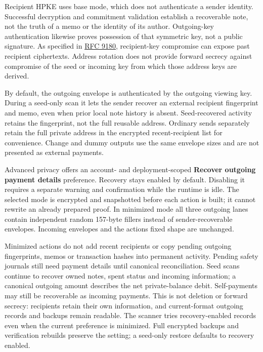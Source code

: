 \documentclass[11pt,letterpaper]{article}
\begin{document}
Recipient HPKE uses base mode, which does not authenticate a sender
identity. Successful decryption and commitment validation establish a
recoverable note, not the truth of a memo or the identity of its author.
Outgoing-key authentication likewise proves possession of that symmetric
key, not a public signature. As specified in
\href{https://www.rfc-editor.org/rfc/rfc9180\#section-9.1}{RFC 9180},
recipient-key compromise can expose past recipient ciphertexts. Address
rotation does not provide forward secrecy against compromise of the seed
or incoming key from which those address keys are derived.

By default, the outgoing envelope is authenticated by the outgoing
viewing key. During a seed-only scan it lets the sender recover an
external recipient fingerprint and memo, even when prior local note
history is absent. Seed-recovered activity retains the fingerprint, not
the full reusable address. Ordinary sends separately retain the full
private address in the encrypted recent-recipient list for convenience.
Change and dummy outputs use the same envelope sizes and are not
presented as external payments.

Advanced privacy offers an account- and deployment-scoped
\textbf{Recover outgoing payment details} preference. Recovery stays
enabled by default. Disabling it requires a separate warning and
confirmation while the runtime is idle. The selected mode is encrypted
and snapshotted before each action is built; it cannot rewrite an
already prepared proof. In minimized mode all three outgoing lanes
contain independent random 157-byte fillers instead of
sender-recoverable envelopes. Incoming envelopes and the
action\textquotesingle s fixed shape are unchanged.

Minimized actions do not add recent recipients or copy pending outgoing
fingerprints, memos or transaction hashes into permanent activity.
Pending safety journals still need payment details until canonical
reconciliation. Seed scans continue to recover owned notes, spent status
and incoming information; a canonical outgoing amount describes the net
private-balance debit. Self-payments may still be recoverable as
incoming payments. This is not deletion or forward secrecy: recipients
retain their own information, and current-format outgoing records and
backups remain readable. The scanner tries recovery-enabled records even
when the current preference is minimized. Full encrypted backups and
verification rebuilds preserve the setting; a seed-only restore defaults
to recovery enabled.
\end{document}
